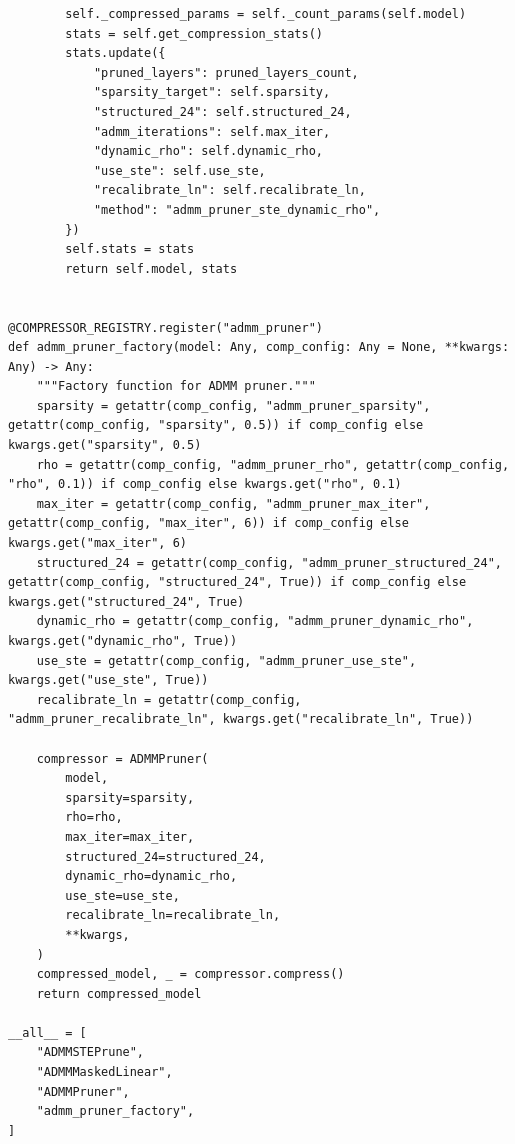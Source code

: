 \begin{lstlisting}
        self._compressed_params = self._count_params(self.model)
        stats = self.get_compression_stats()
        stats.update({
            "pruned_layers": pruned_layers_count,
            "sparsity_target": self.sparsity,
            "structured_24": self.structured_24,
            "admm_iterations": self.max_iter,
            "dynamic_rho": self.dynamic_rho,
            "use_ste": self.use_ste,
            "recalibrate_ln": self.recalibrate_ln,
            "method": "admm_pruner_ste_dynamic_rho",
        })
        self.stats = stats
        return self.model, stats


@COMPRESSOR_REGISTRY.register("admm_pruner")
def admm_pruner_factory(model: Any, comp_config: Any = None, **kwargs: Any) -> Any:
    """Factory function for ADMM pruner."""
    sparsity = getattr(comp_config, "admm_pruner_sparsity", getattr(comp_config, "sparsity", 0.5)) if comp_config else kwargs.get("sparsity", 0.5)
    rho = getattr(comp_config, "admm_pruner_rho", getattr(comp_config, "rho", 0.1)) if comp_config else kwargs.get("rho", 0.1)
    max_iter = getattr(comp_config, "admm_pruner_max_iter", getattr(comp_config, "max_iter", 6)) if comp_config else kwargs.get("max_iter", 6)
    structured_24 = getattr(comp_config, "admm_pruner_structured_24", getattr(comp_config, "structured_24", True)) if comp_config else kwargs.get("structured_24", True)
    dynamic_rho = getattr(comp_config, "admm_pruner_dynamic_rho", kwargs.get("dynamic_rho", True))
    use_ste = getattr(comp_config, "admm_pruner_use_ste", kwargs.get("use_ste", True))
    recalibrate_ln = getattr(comp_config, "admm_pruner_recalibrate_ln", kwargs.get("recalibrate_ln", True))

    compressor = ADMMPruner(
        model,
        sparsity=sparsity,
        rho=rho,
        max_iter=max_iter,
        structured_24=structured_24,
        dynamic_rho=dynamic_rho,
        use_ste=use_ste,
        recalibrate_ln=recalibrate_ln,
        **kwargs,
    )
    compressed_model, _ = compressor.compress()
    return compressed_model

__all__ = [
    "ADMMSTEPrune",
    "ADMMMaskedLinear",
    "ADMMPruner",
    "admm_pruner_factory",
]
\end{lstlisting}
